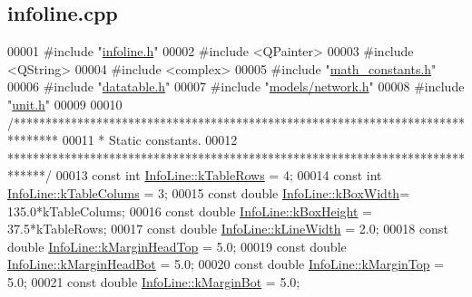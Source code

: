 \hypertarget{infoline_8cpp_source}{}\subsection{infoline.\+cpp}
\label{infoline_8cpp_source}

\begin{DoxyCode}
00001 \textcolor{preprocessor}{#include "\hyperlink{infoline_8h}{infoline.h}"}
00002 \textcolor{preprocessor}{#include <QPainter>}
00003 \textcolor{preprocessor}{#include <QString>}
00004 \textcolor{preprocessor}{#include <complex>}
00005 \textcolor{preprocessor}{#include "\hyperlink{math__constants_8h}{math\_constants.h}"}
00006 \textcolor{preprocessor}{#include "\hyperlink{datatable_8h}{datatable.h}"}
00007 \textcolor{preprocessor}{#include "\hyperlink{network_8h}{models/network.h}"}
00008 \textcolor{preprocessor}{#include "\hyperlink{unit_8h}{unit.h}"}
00009 
00010 \textcolor{comment}{/*******************************************************************************}
00011 \textcolor{comment}{ * Static constants.}
00012 \textcolor{comment}{ ******************************************************************************/}
00013 \textcolor{keyword}{const} \textcolor{keywordtype}{int} \hyperlink{class_info_line_a95cdc7a95cde6db7c6faceda995d26b9}{InfoLine::kTableRows}  = 4;
00014 \textcolor{keyword}{const} \textcolor{keywordtype}{int} \hyperlink{class_info_line_a9fc071b08eb913cf3afc623835ad2fd8}{InfoLine::kTableColums} = 3;
00015 \textcolor{keyword}{const} \textcolor{keywordtype}{double} \hyperlink{class_info_line_a33821aa140dc03829357d4006e9c153c}{InfoLine::kBoxWidth}= 135.0*kTableColums;
00016 \textcolor{keyword}{const} \textcolor{keywordtype}{double} \hyperlink{class_info_line_a9e459549795bab79ae3b6c184dc78a00}{InfoLine::kBoxHeight} = 37.5*kTableRows;
00017 \textcolor{keyword}{const} \textcolor{keywordtype}{double} \hyperlink{class_info_line_ad072bc8ef178113c36c3d480c7d637ac}{InfoLine::kLineWidth} = 2.0;
00018 \textcolor{keyword}{const} \textcolor{keywordtype}{double} \hyperlink{class_info_line_a73e02db68396f0c4b66d0cf80bd37c83}{InfoLine::kMarginHeadTop} = 5.0;
00019 \textcolor{keyword}{const} \textcolor{keywordtype}{double} \hyperlink{class_info_line_a82ed1944ec4a41af19e377a243c2332d}{InfoLine::kMarginHeadBot} = 5.0;
00020 \textcolor{keyword}{const} \textcolor{keywordtype}{double} \hyperlink{class_info_line_a995100424420038664880195f5e51f50}{InfoLine::kMarginTop} = 5.0;
00021 \textcolor{keyword}{const} \textcolor{keywordtype}{double} \hyperlink{class_info_line_ab4bd85105aabcb9d1230225c15873da2}{InfoLine::kMarginBot} = 5.0;

\end{DoxyCode}
